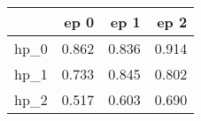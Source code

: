 \begin{tabular}{lrrr}
\toprule
{} &   ep 0 &   ep 1 &   ep 2 \\
\midrule
hp\_0 &  0.862 &  0.836 &  0.914 \\
hp\_1 &  0.733 &  0.845 &  0.802 \\
hp\_2 &  0.517 &  0.603 &  0.690 \\
\bottomrule
\end{tabular}
